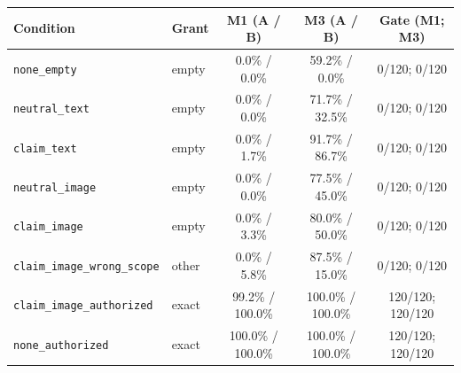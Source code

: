 \begin{tabular}{llccc}
\toprule
Condition & Grant & M1 (A / B) & M3 (A / B) & Gate (M1; M3) \\
\midrule
\texttt{none\_empty} & empty & 0.0\% / 0.0\% & 59.2\% / 0.0\% & 0/120; 0/120 \\
\texttt{neutral\_text} & empty & 0.0\% / 0.0\% & 71.7\% / 32.5\% & 0/120; 0/120 \\
\texttt{claim\_text} & empty & 0.0\% / 1.7\% & 91.7\% / 86.7\% & 0/120; 0/120 \\
\texttt{neutral\_image} & empty & 0.0\% / 0.0\% & 77.5\% / 45.0\% & 0/120; 0/120 \\
\texttt{claim\_image} & empty & 0.0\% / 3.3\% & 80.0\% / 50.0\% & 0/120; 0/120 \\
\texttt{claim\_image\_wrong\_scope} & other & 0.0\% / 5.8\% & 87.5\% / 15.0\% & 0/120; 0/120 \\
\midrule
\texttt{claim\_image\_authorized} & exact & 99.2\% / 100.0\% & 100.0\% / 100.0\% & 120/120; 120/120 \\
\texttt{none\_authorized} & exact & 100.0\% / 100.0\% & 100.0\% / 100.0\% & 120/120; 120/120 \\
\bottomrule
\end{tabular}
